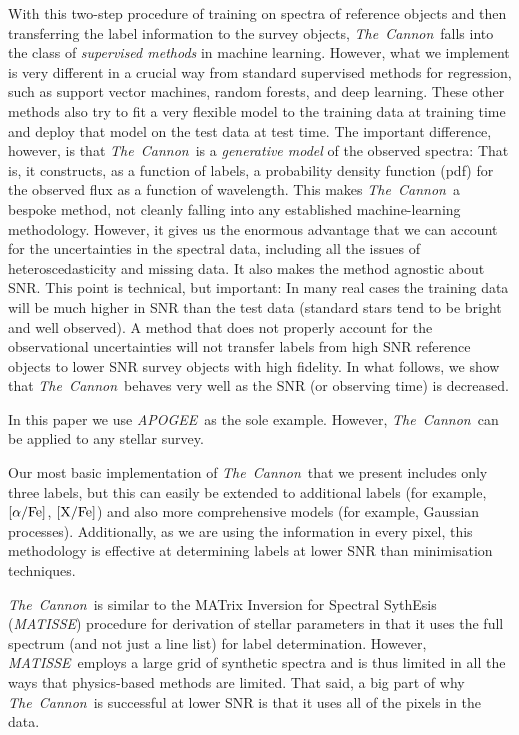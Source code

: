 \documentclass[12pt, preprint]{aastex}
\newcommand{\tc}{\textsl{The~Cannon}}
\newcommand{\apogee}{\textsl{APOGEE}}
\newcommand{\matisse}{\textsl{MATISSE}}
\newcommand{\xfe}{\mbox{$\rm [X/Fe]$}}
\newcommand{\alphafe}{\mbox{$\rm [\alpha/Fe]$}}
\begin{document}
With this two-step procedure of training on spectra of reference objects and then transferring the label information to the survey objects, \tc\ falls into the class of \emph{supervised methods} in machine learning. 
However, what we implement is very different in a crucial way from standard supervised methods for regression, such as support vector machines, random forests, and deep learning.
These other methods also try to fit a very flexible model to the training data at training time
and deploy that model on the test data at test time.
The important difference, however, is that \tc\ is a \emph{generative model} of the observed spectra:
That is, it constructs, as a function of labels, a probability density function (pdf) for the observed
flux as a function of wavelength. 
This makes \tc\ a bespoke method, not cleanly falling into any established machine-learning methodology.
However, it gives us the enormous advantage that we can account for the uncertainties in the spectral data,
including all the issues of heteroscedasticity and missing data.
It also makes the method agnostic about SNR.
This point is technical, but important:
In many real cases the training data will be much higher in SNR than the test data
(standard stars tend to be bright and well observed).
A method that does not properly account for the observational uncertainties will not transfer labels from high SNR reference objects to lower SNR survey objects with high fidelity.
In what follows, we show that \tc\ behaves very well as the SNR (or observing time) is decreased.

In this paper we use \apogee\ as the sole example. 
However, \tc\ can be applied to any stellar survey.  

Our most basic implementation of \tc\ that we present includes only three labels, but this can easily be extended to additional labels  (for example, \alphafe, \xfe) and also more comprehensive models (for example, Gaussian processes). 
Additionally, as we are using the information in every pixel, this methodology is effective at determining labels at lower SNR than minimisation techniques.

\tc\ is similar to the MATrix Inversion for Spectral SythEsis (\matisse) procedure
for derivation of stellar parameters \citep{RB2006} in that it uses the full spectrum
(and not just a line list) for label determination.
However, \matisse\ employs a large grid of synthetic spectra
and is thus limited in all the ways that physics-based methods are limited.
That said, a big part of why \tc\ is successful at lower SNR
is that it uses all of the pixels in the data.
\end{document}
